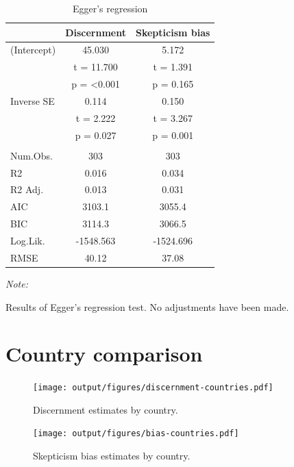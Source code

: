 \documentclass[
  doc,floatsintext]{apa6}
\begin{document}
\begin{table}
\centering
\caption{\label{tab:egger}Egger's regression}
\centering
\begin{threeparttable}
\begin{tabular}[t]{lcc}
\toprule
  & Discernment & Skepticism  bias\\
\midrule
(Intercept) & 45.030 & 5.172\\
 & t = 11.700 & t = 1.391\\
 & p = <0.001 & p = 0.165\\
Inverse SE & 0.114 & 0.150\\
 & t = 2.222 & t = 3.267\\
 & p = 0.027 & p = 0.001\\
\midrule\\
Num.Obs. & 303 & 303\\
R2 & 0.016 & 0.034\\
R2 Adj. & 0.013 & 0.031\\
AIC & 3103.1 & 3055.4\\
BIC & 3114.3 & 3066.5\\
Log.Lik. & -1548.563 & -1524.696\\
RMSE & 40.12 & 37.08\\
\bottomrule
\end{tabular}
\begin{tablenotes}
\item \textit{Note: } 
\item Results of Egger's regression test. No adjustments have been made.
\end{tablenotes}
\end{threeparttable}
\end{table}

\clearpage

\section{Country comparison}\label{country-comparison}

\FloatBarrier



\begin{figure}
\centering
\texttt{[image: output/figures/discernment-countries.pdf]}
\caption{\label{fig:discernment-countries}Discernment estimates by country.}
\end{figure}



\begin{figure}
\centering
\texttt{[image: output/figures/bias-countries.pdf]}
\caption{\label{fig:bias-countries}Skepticism bias estimates by country.}
\end{figure}
\end{document}
